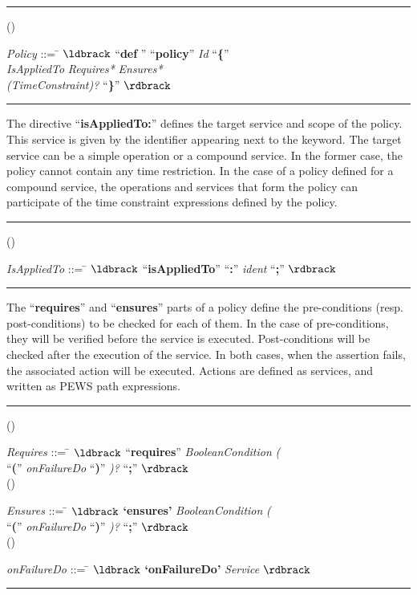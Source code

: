 \documentclass{sig-alternate}
\newcounter{regraB}
\newcommand{\reg}{(\theregraB) \addtocounter{regraB}{1}}
\begin{document}
\bigskip

\hrule


\begin{tabbing}
\reg \textit{Policy} ::= \= $\ldbrack$ ``\textbf{def} '' ``\textbf{policy}'' 
\textit{Id}  ``\textbf{\{}'' \\
  \>  \textit{IsAppliedTo}  
  \textit{Requires*}
  \textit{Ensures*} \\
\>   \textit{(TimeConstraint)?} ``\textbf{\}}'' $\rdbrack$\\[-3mm]
\end{tabbing}


\hrule
\vspace*{2mm}

The directive ``\textbf{isAppliedTo:}'' defines the target service and scope of the policy. 
This service is given by the identifier appearing next to the keyword.
The target service can be a simple operation or a compound service. 
In the former case, the policy cannot contain any time restriction.
In the case of a policy defined for a compound service, the operations and services that form the policy can participate of the time constraint expressions defined by the policy.\nopagebreak\\
\hrule
\begin{tabbing}
 \reg \textit{IsAppliedTo} ::= \= $\ldbrack$ ``\textbf{isAppliedTo}''
  ``\textbf{:}''  \textit{ident} ``\textbf{;}'' $\rdbrack$ \\[-3mm]
  \end{tabbing}
\nopagebreak\hrule\nopagebreak
\vspace*{2mm}

The ``\textbf{requires}'' and ``\textbf{ensures}'' parts of a policy define the
pre-conditions (resp. post-conditions) to be checked for each of them. In the
case of pre-conditions, they will be verified before the service is executed. Post-conditions will be checked after the execution of the service.
In both cases, when the assertion fails, the associated action will be executed.
Actions are defined as services, and written as PEWS path expressions.\\

\hrule
\begin{tabbing}
\reg \textit{Requires} ::= \= $\ldbrack$ ``\textbf{requires}''
  \textit{BooleanCondition} \textit{(} \\  \>   ``\textbf{(}''
  \textit{onFailureDo} ``\textbf{)}'' \textit{)?} ``\textbf{;}'' $\rdbrack$
  \\[1.5mm]
  
   \reg \textit{Ensures} ::= \= $\ldbrack$ \textbf{`ensures'}
  \textit{BooleanCondition} \textit{(} \\  \>  ``\textbf{(}''
  \textit{onFailureDo} ``\textbf{)}'' \textit{)?} ``\textbf{;}'' $\rdbrack$
  \\[1.5mm]
  
   \reg \textit{onFailureDo} ::= \= $\ldbrack$ \textbf{`onFailureDo'}
  \textit{Service} $\rdbrack$ \\[-3mm]
\end{tabbing}
\hrule
\vspace*{2mm}
\end{document}

